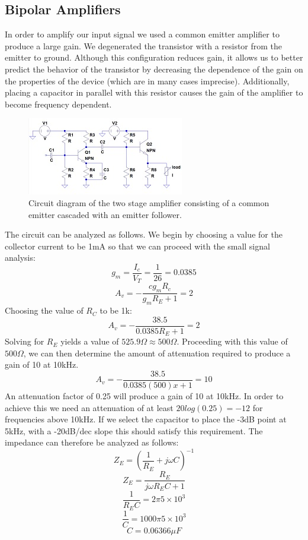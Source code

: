 \documentclass[11pt]{article}
\begin{document}
  \subsection{Bipolar Amplifiers}
  In order to amplify our input signal we used a common emitter amplifier to produce a large gain.  We degenerated the transistor with a resistor from the emitter to ground.  Although this configuration reduces gain, it allows us to better predict the behavior of the transistor by decreasing the dependence of the gain on the properties of the device (which are in many cases imprecise). Additionally, placing a capacitor in parallel with this resistor causes the gain of the amplifier to become frequency dependent. 
  
    \begin{figure}[h!]
    \centering
    \includegraphics[scale=1.7]{amplifier.jpg}
    \caption{Circuit diagram of the two stage amplifier consisting of a common emitter cascaded with an emitter follower.}
    \label{fig:amplifier}
    \end{figure}
  
  The circuit can be analyzed as follows.  We begin by choosing a value for the collector current to be 1mA so that we can proceed with the small signal analysis:
  $$g_m = \frac{I_c}{V_T} = \frac{1}{26} = 0.0385$$
  $$A_v = -\frac{cg_m R_c}{g_m R_E + 1} = 2$$
  Choosing the value of $R_C$ to be 1k:
  $$A_v = -\frac{38.5}{0.0385R_E + 1} = 2$$
  Solving for $R_E$ yields a value of $525.9\Omega \approx 500 \Omega$.  Proceeding with this value of $500\Omega$, we can then determine the amount of attenuation required to produce a gain of 10 at 10kHz.
  $$A_v = -\frac{38.5}{0.0385(500)x + 1} = 10$$
  An attenuation factor of 0.25 will produce a gain of 10 at 10kHz.  In order to achieve this we need an attenuation of at least $20log(0.25) = -12$ for frequencies above 10kHz.  If we select the capacitor to place the -3dB point at 5kHz, with a -20dB/dec slope this should satisfy this requirement.  The impedance can therefore be analyzed as follows:
  $$Z_E = \left(\frac{1}{R_E}+j\omega C\right)^{-1}$$
  $$Z_E = \frac{R_E}{j\omega R_E C + 1}$$
  $$\frac{1}{R_E C} = 2\pi 5\times 10^3$$
  $$\frac{1}{C} = 1000\pi 5\times 10^3$$
  $$C = 0.06366\mu F$$
 
\end{document}
